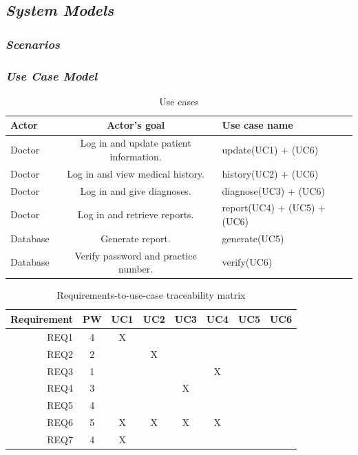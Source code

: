\documentclass[a4paper]{article}
\begin{document}
\newpage
\subsection{\textit{System Models}}
	\subsubsection{\textit{Scenarios}}
	
	\subsubsection{\textit{Use Case Model}}
	
	\begin{table}[h!]
		\centering
		\caption{Use cases}
		\label{tab:table2}
		\begin{tabular}{l|c|l}
			Actor & Actor's goal & Use case name\\
			\hline
			Doctor		& Log in and update patient information.									& update(UC1) + (UC6)\\
			Doctor		& Log in and view medical history.											& history(UC2) + (UC6)\\
			Doctor		& Log in and give diagnoses.												& diagnose(UC3) + (UC6)\\
			Doctor		& Log in and retrieve reports.												& report(UC4) + (UC5) + (UC6)\\
			Database	& Generate report.															& generate(UC5)\\
			Database	& Verify password and practice number.										& verify(UC6)
		\end{tabular}
	\end{table}
	
	\begin{table}[h!]
		\centering
		\caption{Requirements-to-use-case traceability matrix}
		\label{tab:table3}
		\begin{tabular}{r|c|c|c|c|c|c|c}
			Requirement & PW & UC1 & UC2 & UC3 & UC4 & UC5 & UC6\\
			\hline
			REQ1		& 4  &  X  &     &     &     &     &    \\
			REQ2		& 2	 &     &  X  &     &     &     &    \\
			REQ3		& 1	 &     &     &     &  X  &     &    \\
			REQ4		& 3  &     &     &  X  &     &     &    \\
			REQ5		& 4  &     &     &     &     &     &    \\
			REQ6		& 5	 &  X  &  X  &  X  &  X  &     &    \\
			REQ7		& 4  &  X  &     &     &     &     &    \\
		\end{tabular}
	\end{table}
	
\end{document}
